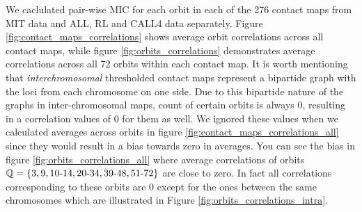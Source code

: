 \documentclass[a4,center,fleqn]{NAR}
\begin{document}
We caclulated pair-wise MIC for each orbit in each of the 276
contact maps from MIT data and ALL, RL and CALL4 data separately. 
Figure \ref{fig:contact_maps_correlations}
shows average orbit correlations across all contact maps, while
figure \ref{fig:orbits_correlations} 
demonstrates average correlations across all 72 orbits within each  contact map.
It is worth mentioning that \textit{interchromosomal} thresholded contact maps 
represent
a bipartide graph with the loci from each chromosome on one side. Due to this
bipartide nature of the graphs in inter-chromosomal maps,
count of certain orbits is always 0, resulting in
a correlation values of 0 for them as well.
We ignored these values  when we calculated averages across orbits 
in figure \ref{fig:contact_maps_correlations_all} since they
would result in a bias towards zero in averages. You can see the bias in 
figure \ref{fig:orbits_correlations_all} where average correlations of orbits
$\mathbb{Q} = \{3, 9, 10{\text -}14, 20{\text -}34, 39{\text -}48, 51{\text -}72\}$ 
are close to zero. In fact all correlations
corresponding to these orbits are 0 except for the ones between the same 
chromosomes which are illustrated in Figure 
\ref{fig:orbits_correlations_intra}.
\end{document}
